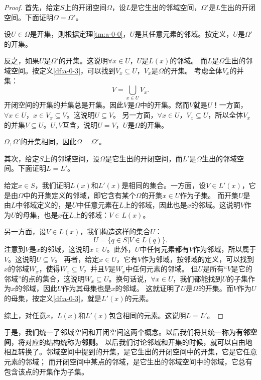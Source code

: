 \documentclass[12pt,UTF8]{ctexbook}
\begin{document}
\begin{appendix}
\begin{proof}
    首先，给定$S$上的开闭空间$\Omega$，设$L$是它生出的邻域空间，$\Omega'$是$L$生出的开闭空间。下面证明$\Omega = \Omega'$。
    
    设$U\in\Omega$是开集，则根据定理\ref{tm:a-0-0}，$U$是其任意元素的邻域。按定义，$U$是$\Omega'$的开集。

    反之，如果$U$是$\Omega'$的开集。这说明$\forall x \in U$，$U$是$L(x)$的邻域。
    而$L$是$\Omega$生出的邻域空间。按定义\ref{df:a-0-3}，可以找到$V_x\subseteq U$，$V_x$是$\Omega$的开集。
    考虑全体$V_x$的并集：
    $$V = \bigcup_{x\in U} V_x. $$
    开闭空间的开集的并集总是开集。因此$V$是$\Omega$中的开集。然而$V$就是$U$！一方面，$\forall x\in U$，$x\in V_x \subseteq V$。这说明$U\subseteq V$。
    另一方面，$\forall x\in U$，$V_x\subseteq U$，所以全体$V_x$的并集$V\subseteq U$。$U, V$互含，说明$U = V$，$U$是$\Omega$的开集。

    $\Omega,\Omega'$的开集相同，因此$\Omega = \Omega'$。

    其次，给定$S$上的邻域空间，设$\Omega$是它生出的开闭空间，而$L'$是$\Omega$生出的邻域空间。下面证明$L=L'$。

    给定$x\in S$，我们证明$L(x)$和$L'(x)$是相同的集合。一方面，设$V\in L'(x)$，它是由$\Omega$中的开集定义的邻域，即它含有某个$\Omega$的开集$x\in U$作为子集。
    而开集$U$是由$L$中邻域定义的，是$U$中任意元素在$L$上的邻域，因此也是$x$的邻域。这说明$V$作为$U$的母集，也是$x$在$L$上的邻域：$V\in L(x)$。

    另一方面，设$V\in L(x)$，我们构造这样的集合$U$：
    $$ U = \{q \in S | V \in L(q)\}. $$
    注意到$V$是$x$的邻域，这说明$x\in U$。此外，$U$中任何元素都有$V$作为邻域，所以属于$V$。这说明$U\subseteq V$。
    再者，给定$x\in U$，它有$V$作为邻域，按邻域的定义，可以找到$x$的邻域$W_x$，使得$W_x \subseteq V$，并且$V$是$W_x$中任何元素的邻域。
    但$U$是所有“$V$是它的邻域”的点的集合，这说明$W_x\subseteq U$。换句话说，$\forall x\in U$，我们都能找到$U$的子集作为$x$的邻域，因此$U$作为其母集也是$x$的邻域。
    这就证明了$U$是$\Omega$的开集。而$V$作为$U$的母集，按定义\ref{df:a-0-3}，就是$L'(x)$的元素。

    综上，对任意$x$，$L(x)$和$L'(x)$包含相同的元素。这说明$L=L'$。    
\end{proof}

于是，我们统一了邻域空间和开闭空间这两个概念。以后我们将其统一称为\textbf{有邻空间}，将对应的结构统称为\textbf{邻则}。
以后我们讨论邻域和开集的时候，就可以自由地相互转换了。邻域空间中提到的开集，是它生出的开闭空间中的开集，它是它任意元素的邻域；
而开闭空间中某点的邻域，是它生出的邻域空间中的邻域，它总有包含该点的开集作为子集。


\end{appendix}
\end{document}
